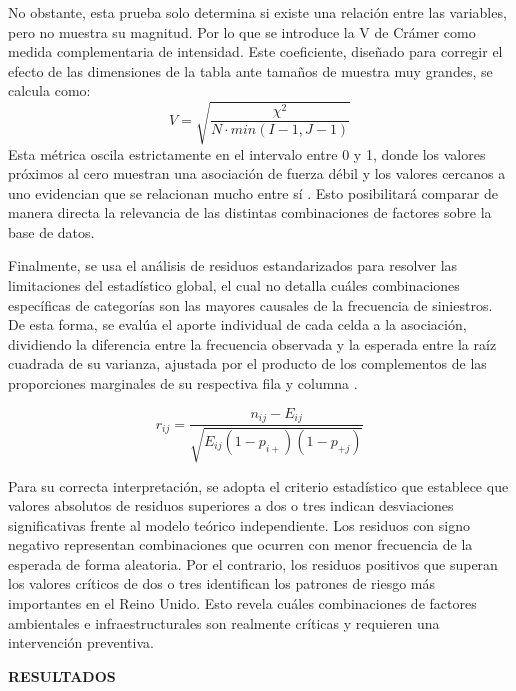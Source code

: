\documentclass[11pt]{article}
\newcommand{\seccion}[1]{%
  \vspace{1.2em}
  \begin{center}\textbf{#1}\end{center}
  \vspace{0.3em}
}
\begin{document}
No obstante, esta prueba solo determina si existe una relación entre las variables, 
pero no muestra su magnitud. Por lo que se introduce la V de Crámer como medida complementaria de 
intensidad. Este coeficiente, diseñado para corregir el efecto de las dimensiones de 
la tabla ante tamaños de muestra muy grandes, se calcula como:
$$
V = \sqrt{\frac{\chi^2}{N \cdot min(I-1, J-1)}}
$$
Esta métrica oscila estrictamente en el intervalo entre 0 y 1, donde los valores próximos 
al cero muestran una asociación de fuerza débil y los valores cercanos a uno evidencian 
que se relacionan mucho entre sí \parencite{McHugh2013}. Esto posibilitará comparar 
de manera directa la relevancia de las distintas combinaciones de factores sobre la 
base de datos.

Finalmente, se usa el análisis de residuos estandarizados para resolver las 
limitaciones del estadístico global, el cual no detalla cuáles combinaciones 
específicas de categorías son las mayores causales de la frecuencia de siniestros. 
De esta forma, se evalúa el aporte individual de cada celda a la asociación, dividiendo 
la diferencia entre la frecuencia observada y la esperada entre la raíz cuadrada de su 
varianza, ajustada por el producto de los complementos de las proporciones marginales de 
su respectiva fila y columna \parencite{Agresti2002}.

$$
r_{ij} = \frac{n_{ij} - E_{ij}}{\sqrt{E_{ij}(1-p_{i+})(1-p_{+j})}}
$$

Para su correcta interpretación, se adopta el criterio
 estadístico que establece que valores absolutos de residuos 
 superiores a dos o tres indican desviaciones significativas frente al 
 modelo teórico independiente. Los residuos con signo negativo representan 
 combinaciones que ocurren con menor frecuencia de la esperada de forma aleatoria. 
 Por el contrario, los residuos positivos que superan los valores críticos de dos o 
 tres identifican los patrones de riesgo más importantes en el Reino Unido. 
 Esto revela cuáles combinaciones de factores ambientales e infraestructurales son 
 realmente críticas y requieren una intervención preventiva.

\seccion{RESULTADOS}
\end{document}
